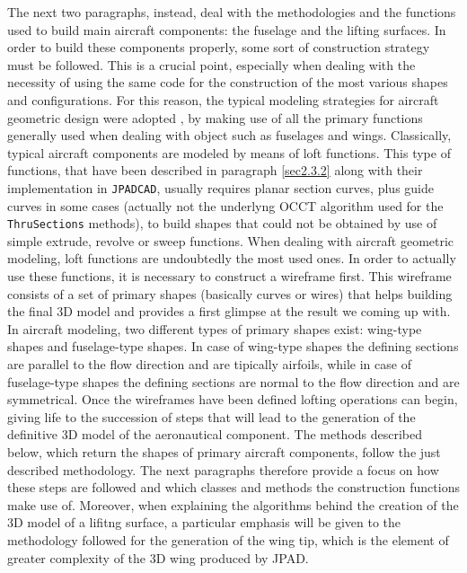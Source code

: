 \bigskip
\noindent
The next two paragraphs, instead, deal with the methodologies and the functions used to build main aircraft components: the fuselage and the lifting surfaces. In order to build these components properly, some sort of construction strategy must be followed. This is a crucial point, especially when dealing with the necessity of using the same code for the construction of the most various shapes and configurations. For this reason, the typical modeling strategies for aircraft geometric design were adopted \cite{paperCADinAero}, by making use of all the primary functions generally used when dealing with object such as fuselages and wings. Classically, typical aircraft components are modeled by means of loft functions. This type of functions, that have been described in paragraph \ref{sec2.3.2} along with their implementation in \lstinline[language=Java]!JPADCAD!, usually requires planar section curves, plus guide curves in some cases (actually not the underlyng \gls{OCCT} algorithm used for the \lstinline[language=Java]!ThruSections! methods), to build shapes that could not be obtained by use of simple extrude, revolve or sweep functions. When dealing with aircraft geometric modeling, loft functions are undoubtedly the most used ones. In order to actually use these functions, it is necessary to construct a wireframe first. This wireframe consists of a set of primary shapes (basically curves or wires) that helps building the final 3D model and provides a first glimpse at the result we coming up with. In aircraft modeling, two different types of primary shapes exist: wing-type shapes and fuselage-type shapes. In case of wing-type shapes the defining sections are parallel to the flow direction and are tipically airfoils, while in case of fuselage-type shapes the defining sections are normal to the flow direction and are symmetrical. Once the wireframes have been defined lofting operations can begin, giving life to the succession of steps that will lead to the generation of the definitive 3D model of the aeronautical component. The methods described below, which return the shapes of primary aircraft components, follow the just described methodology. The next paragraphs therefore provide a focus on how these steps are followed and which classes and methods the construction functions make use of. Moreover, when explaining the algorithms behind the creation of the 3D model of a lifitng surface, a particular emphasis will be given to the methodology followed for the generation of the wing tip, which is the element of greater complexity of the 3D wing produced by \gls{JPAD}. 

